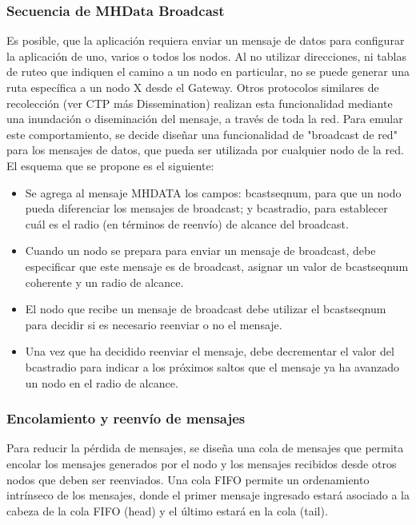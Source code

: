 \subsubsection{Secuencia de MHData Broadcast}
 Es posible, que la aplicación requiera enviar un mensaje de datos para configurar la aplicación de uno, varios o todos los nodos. Al no utilizar direcciones, ni tablas de ruteo que indiquen el camino a un nodo en particular, no se puede generar una ruta específica a un nodo X desde el Gateway. Otros protocolos similares de recolección (ver CTP más Dissemination) realizan esta funcionalidad mediante una inundación o diseminación del mensaje, a través de toda la red. Para emular este comportamiento, se decide diseñar una funcionalidad de "broadcast de red" para los mensajes de datos, que pueda ser utilizada por cualquier nodo de la red. El esquema que se propone es el siguiente:

\begin{itemize}
\item Se agrega al mensaje MH\textunderscore DATA los campos: bcast\textunderscore seqnum, para que un nodo pueda diferenciar los mensajes de broadcast; y bcast\textunderscore radio, para establecer cuál es el radio (en términos de reenvío) de alcance del broadcast.

\item Cuando un nodo se prepara para enviar un mensaje de broadcast, debe especificar que este mensaje es de broadcast, asignar un valor de  bcast\textunderscore seqnum coherente y un radio de alcance.

\item El nodo que recibe un mensaje de broadcast debe utilizar el bcast\textunderscore seqnum para decidir si es necesario reenviar o no el mensaje.

\item Una vez que ha decidido reenviar el mensaje, debe decrementar el valor del bcast\textunderscore radio para indicar a los próximos saltos que el mensaje ya ha avanzado un nodo en el radio de alcance.
\end{itemize}

\subsubsection{Encolamiento y reenvío de mensajes}
Para reducir la pérdida de mensajes, se diseña una cola de mensajes que permita encolar los mensajes generados por el nodo y los mensajes recibidos desde otros nodos que deben ser reenviados. Una cola FIFO permite un ordenamiento intrínseco de los mensajes, donde el primer mensaje ingresado estará asociado a la cabeza de la cola FIFO (head) y el último estará en la cola (tail).\\ 	


